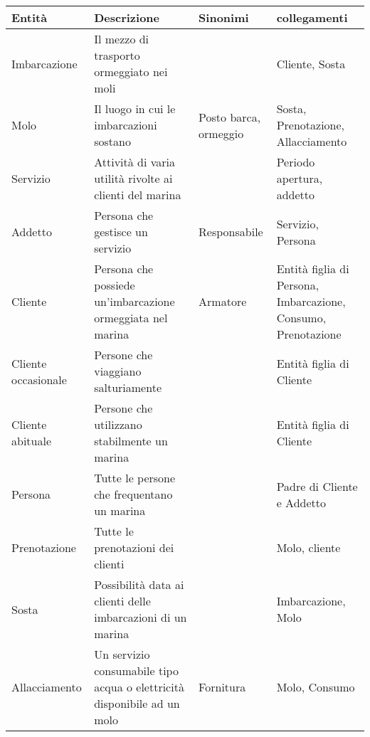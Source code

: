 \begin{center}
    \begin{tabularx}{\textwidth}{|>{\RaggedRight}p{2cm}|p{7cm}|p{2.4cm}|>{\RaggedRight}X|}
        \hline
        \rowcolor{gray!30}
        \textbf{Entità} & \textbf{Descrizione} & \textbf{Sinonimi} & \textbf{collegamenti} \\
        \hline
        Imbarcazione & Il mezzo di trasporto ormeggiato nei moli &  & Cliente, Sosta\\
        
        \hline
        Molo & Il luogo in cui le imbarcazioni sostano & Posto barca, ormeggio & Sosta, Prenotazione, Allacciamento\\
        
        \hline
        Servizio & Attività di varia utilità rivolte ai clienti del marina &  & Periodo apertura, addetto \\
        
        \hline
        Addetto & Persona che gestisce un servizio & Responsabile & Servizio, Persona \\

        \hline
        Cliente& Persona che possiede un'imbarcazione ormeggiata nel marina & Armatore & Entità figlia di Persona, Imbarcazione, Consumo, Prenotazione\\
        
        \hline
        Cliente occasionale &Persone che viaggiano salturiamente & & Entità figlia di Cliente  \\
         
        \hline
        Cliente abituale & Persone che utilizzano stabilmente un marina &  & Entità figlia di Cliente \\
          
        \hline
        Persona& Tutte le persone che frequentano un marina   &  & Padre di Cliente e Addetto \\  
        
        \hline
        Prenotazione & Tutte le prenotazioni dei clienti &  & Molo, cliente \\
        
        \hline
        Sosta & Possibilità data ai clienti delle imbarcazioni di un marina  & & Imbarcazione, Molo \\
        
        \hline
        Allacciamento & Un servizio consumabile tipo acqua o elettricità disponibile ad un molo & Fornitura & Molo, Consumo\\
        

\end{tabularx}
\end{center}
